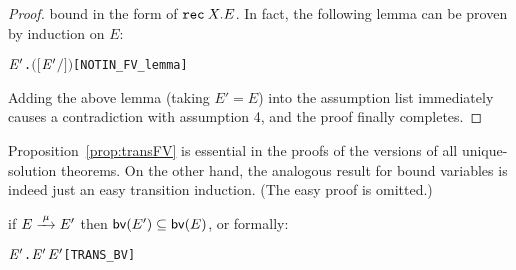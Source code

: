 \begin{proof}
bound in the form of ${\tt rec}\: X . E$. In fact, the following lemma can be
proven by induction on $E$:
\begin{alltt}
\HOLTokenTurnstile{} \HOLSymConst{\HOLTokenForall{}}  \ensuremath{\HOLBoundVar{E}\sp{\prime}}.  \HOLSymConst{\HOLTokenNotIn{}}  \ensuremath{(}\ensuremath{[}  \ensuremath{\HOLBoundVar{E}\sp{\prime}}\ensuremath{/}\ensuremath{]} \ensuremath{)}\hfill{[NOTIN_FV_lemma]}
\end{alltt}
Adding the above lemma (taking $E' = E$) into the assumption list immediately causes
a contradiction with assumption 4, and the proof finally completes.
\end{proof}

Proposition~\ref{prop:transFV} is essential in the proofs of the
  \multivariate versions of all unique-solution theorems.
On the other hand, the analogous
result for bound variables is indeed just an easy transition
induction. (The easy proof is omitted.)
\begin{proposition}
\label{prop:transBV}
if $E \arr{\mu} E'$ then ${{\rm\sf{bv}}}(E') \subseteq {{\rm\sf{bv}}}(E)$, or formally:
\begin{alltt}
\HOLTokenTurnstile{} \HOLSymConst{\HOLTokenForall{}}  \ensuremath{\HOLBoundVar{E}\sp{\prime}}.  \HOLTokenTransBegin{}\HOLTokenTransEnd \ensuremath{\HOLBoundVar{E}\sp{\prime}} \HOLSymConst{\HOLTokenImp{}}  \ensuremath{\HOLBoundVar{E}\sp{\prime}} \HOLSymConst{\HOLTokenSubset{}}  \hfill{[TRANS_BV]}
\end{alltt}
\end{proposition}
